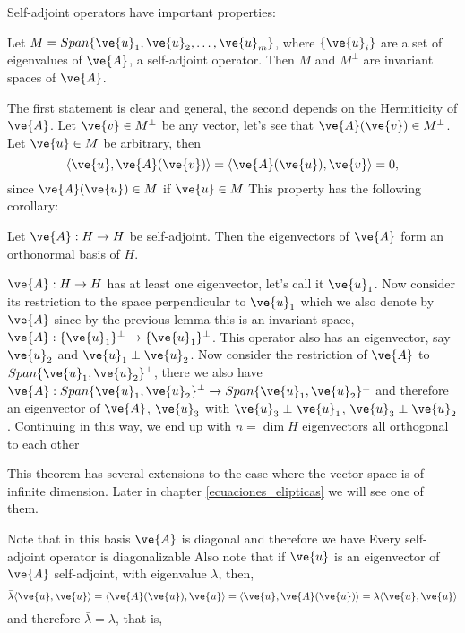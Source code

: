 {Self-adjoint operators have important properties:

\blem
Let $M = Span\{\ve{u}_{1},\ve{u}_2,\dots,\ve{u}_m\}$, where $\{\ve{u}_i\}$
are a set of eigenvalues of $\ve{A}$, a self-adjoint operator.
Then $M$ and $M^{\perp}$ are invariant spaces of $\ve{A}$.
\elem

\bpru 
The first statement is clear and general, the second depends on the
Hermiticity of $\ve{A}$. Let $\ve{v} \in M^{\perp}$ be any vector, let's see
that $\ve{A}(\ve{v}) \in M^{\perp}$. Let $\ve{u} \in M$ be arbitrary, then
\begin{equation}
  \langle \ve{u},\ve{A}(\ve{v}) \rangle = \langle \ve{A}(\ve{u}),\ve{v} \rangle = 0,
\end{equation}
%
since $\ve{A}(\ve{u}) \in M$ if $\ve{u} \in M$
\epru
\espa
This property has the following corollary:

\bcor
Let $\ve{A}:H \to H$ be self-adjoint. Then the eigenvectors of $\ve{A}$ form an orthonormal basis of $H$.
\ecor

\bpru
$\ve{A}: H \to H$ has at least one eigenvector, let's call it $\ve{u}_1$. 
Now consider its restriction to the space perpendicular to $\ve{u}_1$
which we also denote by $\ve{A}$ since by the previous lemma this is
an invariant space, $\ve{A}:\{\ve{u}_1\}^{\perp} \to \{\ve{u}_1\}^{\perp}$.
This operator also has an eigenvector, say $\ve{u}_2$ and 
$\ve{u}_1 \perp \ve{u}_2$. Now consider the restriction of $\ve{A}$ to
$Span\{\ve{u}_1,\ve{u}_2\}^{\perp}$, there we also have 
$\ve{A}:Span\{\ve{u}_1,\ve{u}_2\}^{\perp} \to Span\{\ve{u}_1,\ve{u}_2\}^{\perp}$
and therefore an eigenvector of $\ve{A}$, $\ve{u}_3$ with 
$\ve{u}_3 \perp \ve{u}_1$, $\ve{u}_3 \perp \ve{u}_2$.
Continuing in this way, we end up with $n = \dim H$ eigenvectors all
orthogonal to each other
\epru

This theorem has several extensions to the case where the vector space is
of infinite dimension. 
Later in chapter \ref{ecuaciones_elipticas} we will see one of them.

Note that in this basis $\ve{A}$ is diagonal and therefore we have
\bcor
Every self-adjoint operator is diagonalizable
\ecor
%
Also note that if $\ve{u}$ is an eigenvector of $\ve{A}$ self-adjoint,
with eigenvalue $\lambda$, then,
\begin{equation} 
  \bar{\lambda} \langle \ve{u},\ve{u} \rangle = \langle \ve{A}(\ve{u}),\ve{u} \rangle
                               = \langle \ve{u},\ve{A}(\ve{u})\rangle
                               = \lambda \langle \ve{u},\ve{u} \rangle
\end{equation}
and therefore $\bar{\lambda} = \lambda$, that is,
    
}
